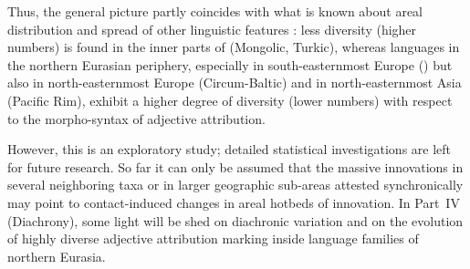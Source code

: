 
Thus, the general picture partly coincides with what is known about areal distribution and spread of other linguistic features \citep[cf., e.g.,][]{nichols1992}: less diversity (higher numbers) is found in the inner parts of  (Mongolic, Turkic), whereas languages in the northern Eurasian periphery, especially in south\hyp{}easternmost Europe () but also in north-easternmost Europe (Circum-Baltic) and in north-easternmost Asia (Pacific Rim), exhibit a higher degree of diversity (lower numbers) with respect to the morpho-syntax of adjective attribution.


However, this is an exploratory study; detailed statistical investigations are left for future research. So far it can only be assumed that the massive innovations in several neighboring taxa or in larger geographic sub-areas attested synchronically may point to contact-induced changes in areal hotbeds of innovation. In Part~IV (Diachrony), some light will be shed on diachronic variation and on the evolution of highly diverse adjective attribution marking inside language families of northern Eurasia.


